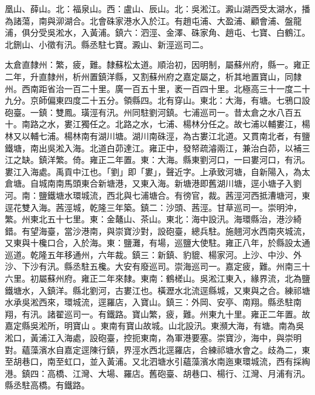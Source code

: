 \begin{pinyinscope}
凰山、薛山。北：福泉山。西：盧山、辰山。北：吳淞江。澱山湖西受太湖水，播為諸蕩，南與泖湖合。北會硃家港水入於江。有趙屯浦、大盈浦、顧會浦、盤龍浦，俱分受吳淞水，入黃浦。鎮六：泗涇、金澤、硃家角、趙屯、七寶、白鶴江。北鉶山、小徵有汛。縣丞駐七寶。澱山、新涇巡司二。

太倉直隸州：繁，疲，難。隸蘇松太道。順治初，因明制，屬蘇州府，縣一。雍正二年，升直隸州，析州置鎮洋縣，又割蘇州府之嘉定屬之，析其地置寶山，同隸州。西南距省治一百二十里。廣一百五十里，袤一百四十里。北極高三十一度二十九分。京師偏東四度二十五分。領縣四。北有穿山。東北：大海，有塘。七鴉口設砲臺。一鎮：雙鳳。璜涇有汛。州同駐劉河鎮。七浦巡司一。昔太倉之水八百五十。南路之水，婁江獨任之。北路之水，七浦、楊林分任之。故七浦以輔婁江，楊林又以輔七浦。楊林南有湖川塘。湖川南硃涇，為古婁江北道。又貫南北者，有鹽鐵塘，南出吳淞入海。北道白茆達江。雍正中，發帑疏濬兩江，兼治白茆，以補三江之缺。鎮洋繁。倚。雍正二年置。東：大海。縣東劉河口，一曰婁河口，有汛。婁江入海處。禹貢中江也。「劉」即「婁」，聲近字。上承致河塘，自新陽入，為太倉塘。自城南南馬頭東合新塘港，又東入海。新塘港即舊湖川塘，逕小塘子入劉河。南：鹽鐵塘水環城流，西北與七浦塘合。有徬官，裁。茜涇河西抵漕塘河，東逕花雙入海。茜涇城，乾隆三年築。鎮二：沙頭、茜涇。甘草巡司一。崇明沖，繁。州東北五十七里。東：金鼇山、茶山。東北：海中設汛。海環縣治，港沙綺錯。有望海臺，當沙港南，與崇寶沙對，設砲臺，總兵駐。施翹河水西南夾城流，又東與十欃口合，入於海。東：鹽灘，有場，巡鹽大使駐。雍正八年，於縣設太通巡道。乾隆五年移通州，六年裁。鎮三：新鎮、豹貔、楊家河。上沙、中沙、外沙、下沙有汛。縣丞駐五欃。大安有廢巡司。崇海巡司一。嘉定疲，難。州南三十六里。初屬蘇州府。雍正二年來隸。東南：鶴槎山。吳淞江東入，緣界流，北為鹽鐵塘水，入鎮洋。縣北劉河，古婁江也。橫瀝水北流逕縣城，又東與之合。練祁塘水承吳淞西來，環城流，逕羅店，入寶山。鎮三：外岡、安亭、南翔。縣丞駐南翔，有汛。諸翟巡司一。有鐵路。寶山繁，疲，難。州東九十里。雍正二年置。故嘉定縣吳淞所，明寶山。東南有寶山故城。山北設汛。東瀕大海，有塘。南為吳淞口，黃浦江入海處，設砲臺，控扼東南，為軍港要塞。崇寶沙，海中，與崇明對。蘊藻濱水自嘉定逕陳行鎮，界涇水西北逕羅店，合練祁塘水會之。歧為二，東至胡巷口，南至虹口，並入黃浦。又北泗塘水引蘊藻濱水南迤東環城流，西有採綯港。鎮四：高橋、江灣、大場、羅店。舊砲臺、胡巷口、楊行、江灣、月浦有汛。縣丞駐高橋。有鐵路。


\end{pinyinscope}
